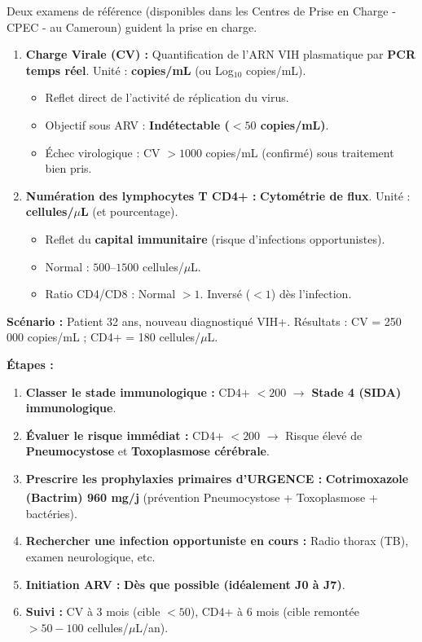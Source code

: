 \documentclass[11pt]{article}
\begin{document}
Deux examens de référence (disponibles dans les Centres de Prise en Charge - CPEC - au Cameroun) guident la prise en charge.

\begin{propriete}
\begin{enumerate}
    \item \textbf{Charge Virale (CV) :} Quantification de l'ARN VIH plasmatique par \textbf{PCR temps réel}. Unité : \textbf{copies/mL} (ou Log$_{10}$ copies/mL).
        \begin{itemize}
            \item Reflet direct de l'activité de réplication du virus.
            \item Objectif sous ARV : \textbf{Indétectable ($< 50$ copies/mL)}.
            \item Échec virologique : CV $> 1000$ copies/mL (confirmé) sous traitement bien pris.
        \end{itemize}
    \item \textbf{Numération des lymphocytes T CD4+ :} \textbf{Cytométrie de flux}. Unité : \textbf{cellules/$\mu$L} (et pourcentage).
        \begin{itemize}
            \item Reflet du \textbf{capital immunitaire} (risque d'infections opportunistes).
            \item Normal : $500$--$1500$ cellules/$\mu$L.
            \item Ratio CD4/CD8 : Normal $> 1$. Inversé ($< 1$) dès l'infection.
        \end{itemize}
\end{enumerate}
\end{propriete}

\begin{methode}
\textbf{Scénario :} Patient 32 ans, nouveau diagnostiqué VIH+. Résultats : CV = 250 000 copies/mL ; CD4+ = 180 cellules/$\mu$L.

\textbf{Étapes :}
\begin{enumerate}
    \item \textbf{Classer le stade immunologique :} CD4+ $< 200$ $\rightarrow$ \textbf{Stade 4 (SIDA) immunologique}.
    \item \textbf{Évaluer le risque immédiat :} CD4+ $< 200$ $\rightarrow$ Risque élevé de \textbf{Pneumocystose} et \textbf{Toxoplasmose cérébrale}.
    \item \textbf{Prescrire les prophylaxies primaires d'URGENCE :} \textbf{Cotrimoxazole (Bactrim\textsuperscript{\textregistered}) 960 mg/j} (prévention Pneumocystose + Toxoplasmose + bactéries).
    \item \textbf{Rechercher une infection opportuniste en cours :} Radio thorax (TB), examen neurologique, etc.
    \item \textbf{Initiation ARV :} \textbf{Dès que possible (idéalement J0 à J7)}.
    \item \textbf{Suivi :} CV à 3 mois (cible $< 50$), CD4+ à 6 mois (cible remontée $> 50-100$ cellules/$\mu$L/an).
\end{enumerate}
\end{methode}
\end{document}
